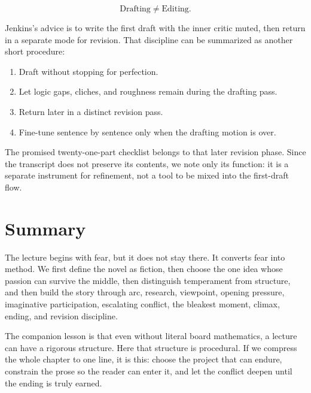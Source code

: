 \begin{equation}
\text{Drafting} \neq \text{Editing}.
\end{equation}

Jenkins's advice is to write the first draft with the inner critic muted, then return in a separate mode for revision. That discipline can be summarized as another short procedure:

\begin{enumerate}
\item Draft without stopping for perfection.
\item Let logic gaps, cliches, and roughness remain during the drafting pass.
\item Return later in a distinct revision pass.
\item Fine-tune sentence by sentence only when the drafting motion is over.
\end{enumerate}

The promised twenty-one-part checklist belongs to that later revision phase. Since the transcript does not preserve its contents, we note only its function: it is a separate instrument for refinement, not a tool to be mixed into the first-draft flow.

\section{Summary}

The lecture begins with fear, but it does not stay there. It converts fear into method. We first define the novel as fiction, then choose the one idea whose passion can survive the middle, then distinguish temperament from structure, and then build the story through arc, research, viewpoint, opening pressure, imaginative participation, escalating conflict, the bleakest moment, climax, ending, and revision discipline.

The companion lesson is that even without literal board mathematics, a lecture can have a rigorous structure. Here that structure is procedural. If we compress the whole chapter to one line, it is this: choose the project that can endure, constrain the prose so the reader can enter it, and let the conflict deepen until the ending is truly earned.